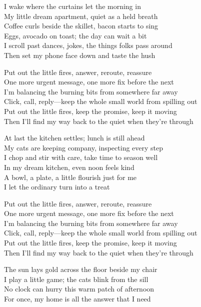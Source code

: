 \begin{lyrics}
I wake where the curtains let the morning in\\
My little dream apartment, quiet as a held breath\\
Coffee curls beside the skillet, bacon starts to sing\\
Eggs, avocado on toast; the day can wait a bit\\
I scroll past dances, jokes, the things folks pass around\\
Then set my phone face down and taste the hush

Put out the little fires, answer, reroute, reassure\\
One more urgent message, one more fix before the next\\
I’m balancing the burning bits from somewhere far away\\
Click, call, reply—keep the whole small world from spilling out\\
Put out the little fires, keep the promise, keep it moving\\
Then I’ll find my way back to the quiet when they’re through

At last the kitchen settles; lunch is still ahead\\
My cats are keeping company, inspecting every step\\
I chop and stir with care, take time to season well\\
In my dream kitchen, even noon feels kind\\
A bowl, a plate, a little flourish just for me\\
I let the ordinary turn into a treat

Put out the little fires, answer, reroute, reassure\\
One more urgent message, one more fix before the next\\
I’m balancing the burning bits from somewhere far away\\
Click, call, reply—keep the whole small world from spilling out\\
Put out the little fires, keep the promise, keep it moving\\
Then I’ll find my way back to the quiet when they’re through

The sun lays gold across the floor beside my chair\\
I play a little game; the cats blink from the sill\\
No clock can hurry this warm patch of afternoon\\
For once, my home is all the answer that I need


\end{lyrics}
